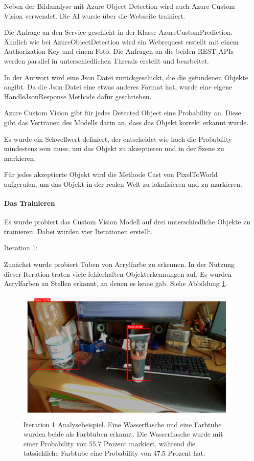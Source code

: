Neben der Bildanalyse mit Azure Object Detection wird auch Azure Custom Vision verwendet.
Die AI wurde über die Webseite trainiert.

Die Anfrage an den Service geschieht in der Klasse AzureCustomPrediction. Ähnlich wie bei AzureObjectDetection wird ein Webrequest erstellt mit einem Authorization Key und einem Foto. Die Anfragen an die beiden REST-APIs werden parallel in unterschiedlichen Threads erstellt und bearbeitet.

In der Antwort wird eine Json Datei zurückgeschickt, die die gefundenen Objekte angibt.
Da die Json Datei eine etwas anderes Format hat, wurde eine eigene HandleJsonResponse Methode dafür geschrieben.

Azure Custom Vision gibt für jedes Detected Object eine Probability an. Diese gibt das Vertrauen des Modells darin an, dass das Objekt korrekt erkannt wurde.

Es wurde ein Schwellwert definiert, der entscheidet wie hoch die Probability mindestens sein muss, um das Objekt zu akzeptieren und in der Szene zu markieren.

Für jedes akzeptierte Objekt wird die Methode Cast von PixelToWorld aufgerufen, um das Objekt in der realen Welt zu lokalisieren und zu markieren.

\paragraph{Das Trainieren}

Es wurde probiert das Custom Vision Modell auf drei unterschiedliche Objekte zu trainieren.
Dabei wurden vier Iterationen erstellt. 

Iteration 1:

Zunächst wurde probiert Tuben von Acrylfarbe zu erkennen. In der Nutzung dieser Iteration traten viele fehlerhaften Objekterkennungen auf. Es wurden Acrylfarben an Stellen erkannt, an denen es keine gab. Siehe Abbildung \ref{image:customVisionPaint}. 

\begin{figure}[H]
	\centering
	\includegraphics[width=1.0\textwidth]{images/customVisionPaint.PNG}
	\caption[Iteration 1 Analysebeispiel]{Iteration 1 Analysebeispiel. Eine Wasserflasche und eine Farbtube wurden beide als Farbtuben erkannt. Die Wasserflasche wurde mit einer Probability von 55.7 Prozent markiert, während die tatsächliche Farbtube eine Probability von 47.5 Prozent hat.}
	\label{image:customVisionPaint}
\end{figure}

